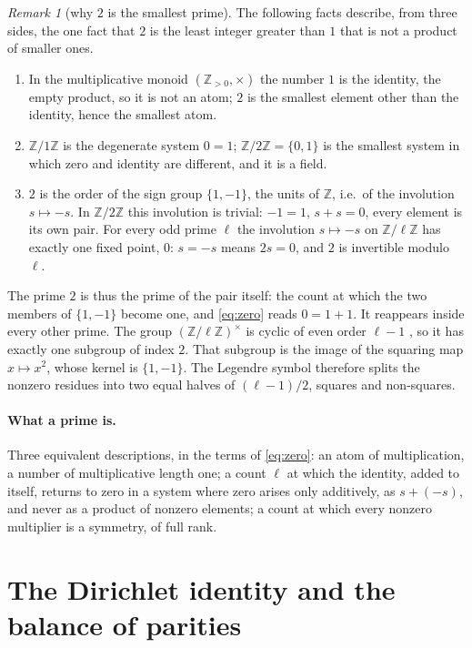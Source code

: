 \documentclass[11pt]{article}
\theoremstyle{definition}\newtheorem{definition}[theorem]{Definition}
\theoremstyle{remark}\newtheorem{remark}[theorem]{Remark}
\begin{document}
\begin{remark}[why $2$ is the smallest prime]\label{rem:two}
The following facts describe, from three sides, the one fact that $2$ is the least integer greater than $1$ that is not a product of smaller ones.
\begin{enumerate}
\item In the multiplicative monoid $(\mathbb Z_{>0},\times)$ the number $1$ is the identity, the empty product, so it is not an atom; $2$ is the smallest element other than the identity, hence the smallest atom.
\item $\mathbb Z/1\mathbb Z$ is the degenerate system $0=1$; $\mathbb Z/2\mathbb Z=\{0,1\}$ is the smallest system in which zero and identity are different, and it is a field.
\item $2$ is the order of the sign group $\{1,-1\}$, the units of $\mathbb Z$, i.e.\ of the involution $s\mapsto-s$. In $\mathbb Z/2\mathbb Z$ this involution is trivial: $-1=1$, $s+s=0$, every element is its own pair. For every odd prime $\ell$ the involution $s\mapsto-s$ on $\mathbb Z/\ell\mathbb Z$ has exactly one fixed point, $0$: $s=-s$ means $2s=0$, and $2$ is invertible modulo $\ell$.
\end{enumerate}
\end{remark}
The prime $2$ is thus the prime of the pair itself: the count at which the two members of $\{1,-1\}$ become one, and \eqref{eq:zero} reads $0=1+1$. It reappears inside every other prime. The group $(\mathbb Z/\ell\mathbb Z)^\times$ is cyclic of even order $\ell-1$ \cite{Lang}, so it has exactly one subgroup of index $2$. That subgroup is the image of the squaring map $x\mapsto x^2$, whose kernel is $\{1,-1\}$. The Legendre symbol therefore splits the nonzero residues into two equal halves of $(\ell-1)/2$, squares and non-squares.

\paragraph{What a prime is.} Three equivalent descriptions, in the terms of \eqref{eq:zero}: an atom of multiplication, a number of multiplicative length one; a count $\ell$ at which the identity, added to itself, returns to zero in a system where zero arises only additively, as $s+(-s)$, and never as a product of nonzero elements; a count at which every nonzero multiplier is a symmetry, of full rank.

\section{The Dirichlet identity and the balance of parities}\label{sec:balance}
\end{document}
